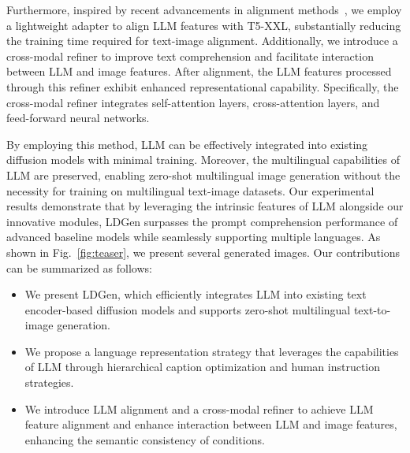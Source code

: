 Furthermore, inspired by recent advancements in alignment methods~\cite{hu2024ella,zhao2024bridging,tan2024empirical}, we employ a lightweight adapter to align LLM features with T5-XXL, substantially reducing the training time required for text-image alignment. Additionally, we introduce a cross-modal refiner to improve text comprehension and facilitate interaction between LLM and image features. After alignment, the LLM features processed through this refiner exhibit enhanced representational capability. Specifically, the cross-modal refiner integrates self-attention layers, cross-attention layers, and feed-forward neural networks.


By employing this method, LLM can be effectively integrated into existing diffusion models with minimal training. Moreover, the multilingual capabilities of LLM are preserved, enabling zero-shot multilingual image generation without the necessity for training on multilingual text-image datasets. Our experimental results demonstrate that by leveraging the intrinsic features of LLM alongside our innovative modules, LDGen surpasses the prompt comprehension performance of advanced baseline models while seamlessly supporting multiple languages. As shown in Fig.~\ref{fig:teaser}, we present several generated images. Our contributions can be summarized as follows:
\begin{itemize}[noitemsep]
    \item We present LDGen, which efficiently integrates LLM into existing text encoder-based diffusion models and supports zero-shot multilingual text-to-image generation.
    
    \item We propose a language representation strategy that leverages the capabilities of LLM through hierarchical caption optimization and human instruction strategies.
    
    \item We introduce LLM alignment and a cross-modal refiner to achieve LLM feature alignment and enhance interaction between LLM and image features, enhancing the semantic consistency of conditions.
\end{itemize}
